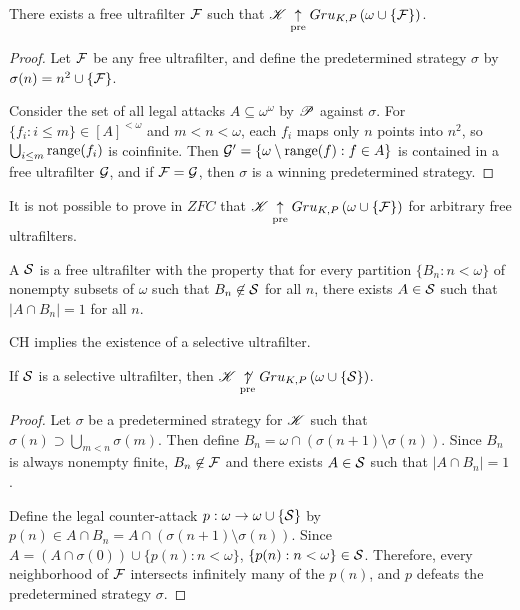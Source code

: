 \begin{thm}
  There exists a free ultrafilter $\mathcal{F}$ such that
  $\mathscr{K}\underset{\text{pre}}{\uparrow} Gru_{K,P}\left({\omega\cup\{\mathcal{F}\}}\right)$.
\end{thm}

\begin{proof}
  Let $\mathcal{F}$ be any free ultrafilter, and
  define the predetermined strategy $\sigma$ by
  $\sigma(n)=n^2\cup\{\mathcal{F}\}$.

  Consider the set of all legal attacks $A\subseteq\omega^\omega$ by
  $\mathscr{P}$ against $\sigma$. For $\{f_i:i\leq m\}\in [A]^{<\omega}$ and
  $m<n<\omega$, each $f_i$ maps only $n$ points into $n^2$, so
  $\bigcup_{i\leq m}\text{range}(f_i)$ is coinfinite.
  Then $\mathcal{G}'=\{\omega\setminus\text{range}(f) : f\in A\}$ is contained in a free
  ultrafilter $\mathcal{G}$, and if $\mathcal{F}=\mathcal{G}$, then $\sigma$ is a
  winning predetermined strategy.
\end{proof}

It is not possible to prove in $ZFC$ that
$\mathscr{K}\underset{\text{pre}}{\uparrow} Gru_{K,P}\left({\omega\cup\{\mathcal{F}\}}\right)$
for arbitrary free ultrafilters.

\begin{defn}
  A  $\mathcal{S}$ is a free ultrafilter with the
  property that for every
  partition $\{B_n : n < \omega\}$ of nonempty subsets of $\omega$ such that
  $B_n \not\in \mathcal{S}$ for all $n$, there exists $A \in \mathcal{S}$ such
  that $|A \cap B_n|=1$ for all $n$.
\end{defn}

\begin{thm}
  CH implies the existence of a selective ultrafilter.
  \cite{MR0080902}
\end{thm}

\begin{thm}
  If $\mathcal{S}$ is a selective ultrafilter, then
  $\mathscr{K}\underset{\text{pre}}{\not\uparrow} Gru_{K,P}\left({\omega\cup\{\mathcal{S}\}}\right)$.
\end{thm}

\begin{proof}
  Let $\sigma$ be a predetermined strategy for $\mathscr{K}$ such that
  $\sigma(n)\supset\bigcup_{m<n}\sigma(m)$.
  Then define $B_n=\omega\cap(\sigma(n+1)\setminus\sigma(n))$. Since $B_n$
  is always nonempty finite, $B_n\not\in\mathcal{F}$ and there exists $A\in \mathcal{S}$
  such that $|A\cap B_n|=1$.

  Define the legal counter-attack $p:\omega\to\omega\cup\{\mathcal{S}\}$ by
  $p(n)\in A\cap B_n=A\cap(\sigma(n+1)\setminus\sigma(n))$. Since
  $A=(A\cap\sigma(0))\cup\{p(n):n<\omega\}$, $\{p(n):n<\omega\}\in\mathcal{S}$.
  Therefore, every neighborhood of $\mathcal{F}$ intersects infinitely many of
  the $p(n)$, and $p$ defeats the predetermined strategy $\sigma$.
\end{proof}

